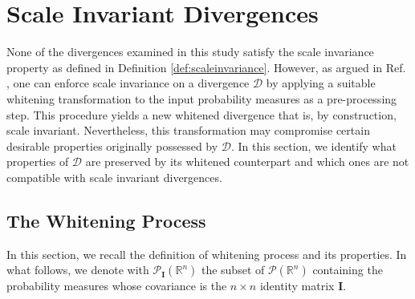 \documentclass{article}
\def \Id{\mathbf{I}}
\def \erre{\mathbb{R}}
\begin{document}




\section{Scale Invariant Divergences}

% 
None of the divergences examined in this study satisfy the scale invariance property as defined in Definition \ref{def:scaleinvariance}.
%
However, as argued in Ref. \cite{ABGT}, one can enforce scale invariance on a divergence $\mathcal{D}$ by applying a suitable whitening transformation to the input probability measures as a pre-processing step.
%
This procedure yields a new whitened divergence that is, by construction, scale invariant. Nevertheless, this transformation may compromise certain desirable properties originally possessed by $\mathcal{D}$.
% 
In this section, we identify what properties of $\mathcal{D}$ are preserved by its whitened counterpart and which ones are not compatible with scale invariant divergences.
% 


\subsection{The Whitening Process}
\label{sec:whitening_processes}
% 
In this section, we recall the definition of whitening process and its properties.
% 
In what follows, we denote with $\mathcal{P}_{\Id}(\erre^n)$ the subset of $\mathcal{P}(\erre^n)$ containing the probability measures whose covariance is the $n\times n$ identity matrix $\Id$.
% 
% 
\end{document}
